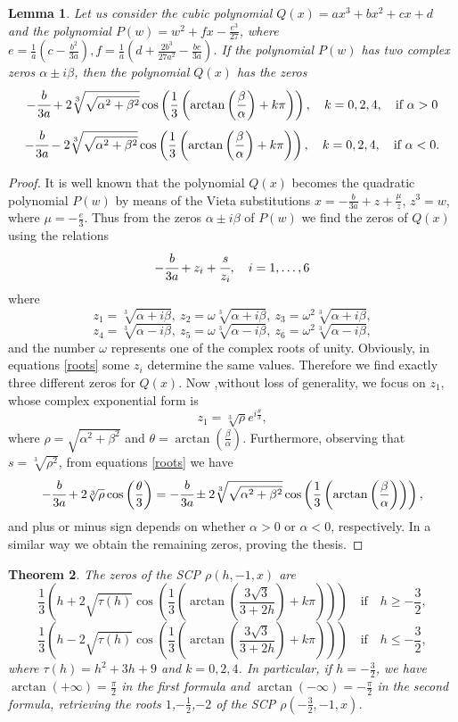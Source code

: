 \documentclass[12pt,reqno]{article}
\newtheorem{theorem}{Theorem}
\newtheorem{lemma}[theorem]{Lemma}
\begin{document}
\begin{lemma} \label{newsolve}
Let us consider the cubic polynomial $Q(x)=ax^3+bx^2+cx+d$ and the polynomial $P(w)=w^2+fx-\frac{e^3}{27}$, where $e=\frac{1}{a}\left(c-\frac{b^2}{3a}\right), f=\frac{1}{a}\left(d+\frac{2b^3}{27a^2}-\frac{bc}{3a}\right)$. If the polynomial $P(w)$ has two complex zeros $\alpha\pm i\beta$, then the polynomial $Q(x)$ has the zeros
$$-\cfrac{b}{3a}+2 \sqrt[3]{\sqrt{\alpha^2+\beta^2}}\cos \left(\frac{1}{3}\left(\arctan \left(\frac{\beta}{\alpha}\right)+k\pi\right)\right),\quad k=0,2,4,\quad \text{if} \ \alpha>0$$
$$-\cfrac{b}{3a}-2 \sqrt[3]{\sqrt{\alpha^2+\beta^2}}\cos \left(\frac{1}{3}\left(\arctan \left(\frac{\beta}{\alpha}\right)+k\pi\right)\right),\quad k=0,2,4,\quad \text{if} \ \alpha<0.$$
\end{lemma}
\begin{proof}
It is well known that the polynomial $Q(x)$ becomes the quadratic polynomial $P(w)$ by means of the Vieta substitutions $x=-\frac{b}{3a}+z+\frac{\mu}{z}$, $z^3=w$, where $\mu=-\frac{e}{3}$. Thus from the zeros $\alpha\pm i\beta$ of $P(w)$ we find the zeros of $Q(x)$ using the relations
\begin{equation} \label{roots} -\cfrac{b}{3a}+z_i+\cfrac{s}{z_i},\quad i=1,\ldots,6 \end{equation}
where 
$$z_1=\sqrt[3]{\alpha+i\beta}, \ z_2=\omega\sqrt[3]{\alpha+i\beta}, \ z_3=\omega^2\sqrt[3]{\alpha+i\beta},$$ $$z_4=\sqrt[3]{\alpha-i\beta}, \ z_5=\omega\sqrt[3]{\alpha-i\beta}, \ z_6=\omega^2\sqrt[3]{\alpha-i\beta},$$
and the number $\omega$ represents one of the complex roots of unity. Obviously, in equations \eqref{roots} some $z_i$ determine the same values. Therefore we find exactly three different zeros for $Q(x)$. Now ,without loss of generality, we focus on $z_1$, whose complex exponential form is  
$$z_1=\sqrt[3]{\rho} e^{i\frac{\theta}{3}},$$
where $\rho=\sqrt{\alpha^2+\beta^2}$ and $\theta=\arctan\left(\frac{\beta}{\alpha}\right)$.
Furthermore, observing that  $s=\sqrt[3]{\rho^2}$, from  equations \eqref{roots} we have
$$-\cfrac{b}{3a}+2\sqrt[3]{\rho}\cos \left(\frac{\theta}{3}\right)=-\cfrac{b}{3a}\pm 2 \sqrt[3]{\sqrt{\alpha^2+\beta^2}}\cos\left( \frac{1}{3}\left(\arctan \left(\frac{\beta}{\alpha}\right)\right)\right),$$
and plus or minus sign depends on whether $\alpha>0$ or $\alpha<0$, respectively. In a similar way we obtain the remaining zeros, proving the thesis.
\end{proof}
\begin{theorem} \label{root-scp}
The zeros of the SCP $\rho(h,-1,x)$ are 
$$\frac{1}{3} \left(h+2 \sqrt{\tau(h)} \cos\left(\frac{1}{3} \left(\arctan\left(\frac{3 \sqrt{3}}{3+2 h}\right)+k\pi \right)\right)\right) \quad \text{if}\quad h\geq-\frac{3}{2},$$
$$\frac{1}{3} \left(h-2 \sqrt{\tau(h)} \cos\left(\frac{1}{3} \left(\arctan\left(\frac{3 \sqrt{3}}{3+2 h} \right)+k\pi\right)\right)\right)\quad \text{if}\quad h\leq-\frac{3}{2},$$
where $\tau(h)=h^2+3h+9$ and $k=0,2,4$. In particular, if $h=-\frac{3}{2}$, we have $\arctan(+\infty)=\frac{\pi}{2}$ in the first formula and $\arctan(-\infty)=-\frac{\pi}{2}$ in the second formula, retrieving the roots $1$,$-\frac{1}{2}$,$-2$ of the SCP $\rho(-\frac{3}{2},-1,x)$.
\end{theorem}
\end{document}
